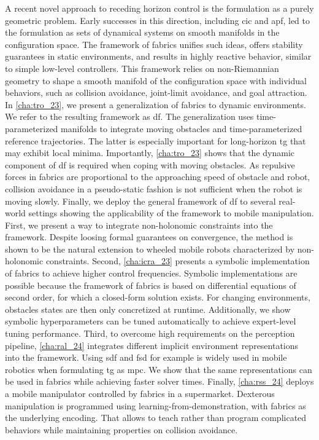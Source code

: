 A recent novel approach to
receding horizon control is the formulation as a purely geometric problem.
Early successes in this direction, including \ac{cic} and \ac{apf}, led to the
formulation as sets of dynamical systems on smooth manifolds in the
configuration space. The framework of \ac{fabrics} unifies such ideas, 
offers stability guarantees in static environments, and results in highly
reactive behavior, similar to simple low-level controllers.
This framework relies on non-Riemannian
geometry to shape a smooth manifold of the configuration space with individual
behaviors, such as collision avoidance, joint-limit avoidance, and goal 
attraction. In \cref{cha:tro_23}, we present a generalization of
\ac{fabrics} to dynamic environments. We refer to the resulting framework as
\ac{df}. The generalization uses time\hyp{}parameterized manifolds to integrate 
moving obstacles and time\hyp{}parameterized reference trajectories. The latter is
especially important for long-horizon \ac{tg} that may exhibit local minima.
Importantly, \cref{cha:tro_23} shows that the dynamic component of \ac{df}
is required when coping with moving obstacles. As repulsive forces 
in \ac{fabrics} are proportional to the approaching speed of obstacle and robot,
collision avoidance in a pseudo-static fashion is not sufficient when the robot
is moving slowly.
Finally, we deploy the general framework of \ac{df} to several real-world
settings showing the applicability of the framework to mobile manipulation.
First, we present a way to
integrate non\hyp{}holonomic constraints into the framework. Despite loosing
formal guarantees on convergence, the method is shown to be the natural extension
to wheeled mobile robots characterized by non\hyp{}holonomic constraints.
Second, \cref{cha:icra_23} presents a symbolic
implementation of \ac{fabrics} to achieve higher control frequencies.
Symbolic implementations are possible because the framework of \ac{fabrics}
is based on differential equations of second order, for which a closed-form
solution exists. For changing environments, obstacles states are then only
concretized at runtime.
Additionally, we show symbolic 
hyperparameters can be tuned automatically to achieve expert-level tuning performance.
Third, to overcome high requirements on the perception pipeline, \cref{cha:ral_24}
integrates different implicit environment representations into the framework.
Using \ac{sdf} and \ac{fsd} for example is widely used in mobile robotics when
formulating \ac{tg} as \ac{mpc}. We show that the same representations can be
used in \ac{fabrics} while achieving faster solver times.
Finally, 
\cref{cha:rss_24} deploys a mobile manipulator controlled by \ac{fabrics}
in a supermarket. Dexterous manipulation is programmed using
learning-from-demonstration, with \ac{fabrics} as the underlying encoding.
That allows to teach rather than program complicated behaviors while
maintaining properties on collision avoidance.

